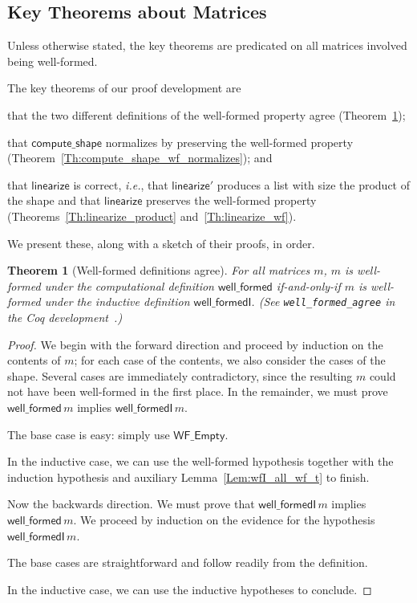 \documentclass[11pt,conference]{IEEEtran}
\newcommand{\func}[1]{\mathsf{#1}}
\newcommand{\iname}[1]{\textsf{#1}}
\theoremstyle{plain} %
\newtheorem{thm}{Theorem}[section]
\theoremstyle{definition}
\theoremstyle{remark}
\begin{document}
\subsection{Key Theorems about Matrices}\label{S:matrix_thm}

Unless otherwise stated, the key theorems are predicated on all matrices
involved being well-formed.

The key theorems of our proof development are
\begin{inlist}
\item that the two different definitions of the well-formed property agree
    (Theorem~\ref{Th:well_formed_agree});
\item that \(\func{compute\_shape}\) normalizes by preserving the well-formed
    property (Theorem~\ref{Th:compute_shape_wf_normalizes}); and
\item that \(\func{linearize}\) is correct, \textit{i.e.}, that
    \(\func{linearize'}\) produces a list with size the product of the shape and
    that \(\func{linearize}\) preserves the well-formed property
    (Theorems~\ref{Th:linearize_product} and~\ref{Th:linearize_wf}).
\end{inlist}
We present these, along with a sketch of their proofs, in order.

\begin{thm}[Well-formed definitions agree]\label{Th:well_formed_agree}
    For all matrices \(m\), \(m\) is well-formed under the computational
    definition \(\func{well\_formed}\) if-and-only-if \(m\) is well-formed under
    the inductive definition \(\func{well\_formedI}\). (See
    \texttt{well\_formed\_agree} in the Coq
    development~\cite{zelda_mosaic_proof}.)
\end{thm}

\begin{proof}
    We begin with the forward direction and proceed by induction on the contents
    of \(m\); for each case of the contents, we also consider the cases of the
    shape. Several cases are immediately contradictory, since the resulting
    \(m\) could not have been well-formed in the first place. In the remainder,
    we must prove \(\func{well\_formed}\, m\) implies \(\func{well\_formedI}\,
    m\).

    The base case is easy: simply use \(\iname{WF\_Empty}\).

    In the inductive case, we can use the well-formed hypothesis together with
    the induction hypothesis and auxiliary Lemma~\ref{Lem:wfI_all_wf_t} to
    finish.

    Now the backwards direction. We must prove that \(\func{well\_formedI}\, m\)
    implies \(\func{well\_formed}\, m\). We proceed by induction on the evidence
    for the hypothesis \(\func{well\_formedI}\, m\).

    The base cases are straightforward and follow readily from the definition.

    In the inductive case, we can use the inductive hypotheses to conclude.
\end{proof}
\end{document}
